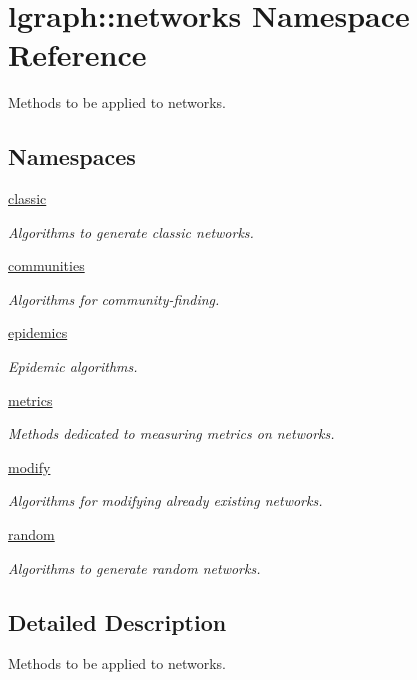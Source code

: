 \hypertarget{namespacelgraph_1_1networks}{}\section{lgraph\+:\+:networks Namespace Reference}
\label{namespacelgraph_1_1networks}


Methods to be applied to networks.  


\subsection*{Namespaces}
\begin{DoxyCompactItemize}
\item 
 \hyperlink{namespacelgraph_1_1networks_1_1classic}{classic}
\begin{DoxyCompactList}\small\item\em Algorithms to generate classic networks. \end{DoxyCompactList}\item 
 \hyperlink{namespacelgraph_1_1networks_1_1communities}{communities}
\begin{DoxyCompactList}\small\item\em Algorithms for community-\/finding. \end{DoxyCompactList}\item 
 \hyperlink{namespacelgraph_1_1networks_1_1epidemics}{epidemics}
\begin{DoxyCompactList}\small\item\em Epidemic algorithms. \end{DoxyCompactList}\item 
 \hyperlink{namespacelgraph_1_1networks_1_1metrics}{metrics}
\begin{DoxyCompactList}\small\item\em Methods dedicated to measuring metrics on networks. \end{DoxyCompactList}\item 
 \hyperlink{namespacelgraph_1_1networks_1_1modify}{modify}
\begin{DoxyCompactList}\small\item\em Algorithms for modifying already existing networks. \end{DoxyCompactList}\item 
 \hyperlink{namespacelgraph_1_1networks_1_1random}{random}
\begin{DoxyCompactList}\small\item\em Algorithms to generate random networks. \end{DoxyCompactList}\end{DoxyCompactItemize}


\subsection{Detailed Description}
Methods to be applied to networks. 